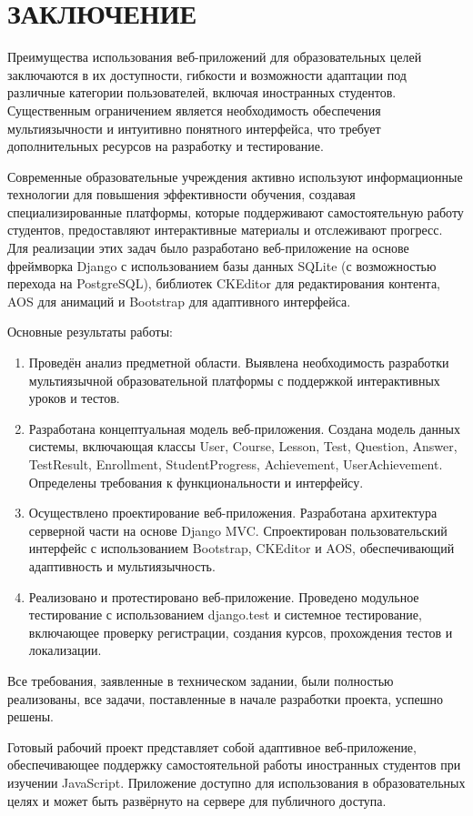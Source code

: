 \section*{ЗАКЛЮЧЕНИЕ}

Преимущества использования веб-приложений для образовательных целей заключаются в их доступности, гибкости и возможности адаптации под различные категории пользователей, включая иностранных студентов. Существенным ограничением является необходимость обеспечения мультиязычности и интуитивно понятного интерфейса, что требует дополнительных ресурсов на разработку и тестирование.

Современные образовательные учреждения активно используют информационные технологии для повышения эффективности обучения, создавая специализированные платформы, которые поддерживают самостоятельную работу студентов, предоставляют интерактивные материалы и отслеживают прогресс. Для реализации этих задач было разработано веб-приложение на основе фреймворка Django с использованием базы данных SQLite (с возможностью перехода на PostgreSQL), библиотек CKEditor для редактирования контента, AOS для анимаций и Bootstrap для адаптивного интерфейса.

Основные результаты работы:

\begin{enumerate}
	\item Проведён анализ предметной области. Выявлена необходимость разработки мультиязычной образовательной платформы с поддержкой интерактивных уроков и тестов.
	\item Разработана концептуальная модель веб-приложения. Создана модель данных системы, включающая классы User, Course, Lesson, Test, Question, Answer, TestResult, Enrollment, StudentProgress, Achievement, UserAchievement. Определены требования к функциональности и интерфейсу.
	\item Осуществлено проектирование веб-приложения. Разработана архитектура серверной части на основе Django MVC. Спроектирован пользовательский интерфейс с использованием Bootstrap, CKEditor и AOS, обеспечивающий адаптивность и мультиязычность.
	\item Реализовано и протестировано веб-приложение. Проведено модульное тестирование с использованием django.test и системное тестирование, включающее проверку регистрации, создания курсов, прохождения тестов и локализации.
\end{enumerate}

Все требования, заявленные в техническом задании, были полностью реализованы, все задачи, поставленные в начале разработки проекта, успешно решены.

Готовый рабочий проект представляет собой адаптивное веб-приложение, обеспечивающее поддержку самостоятельной работы иностранных студентов при изучении JavaScript. Приложение доступно для использования в образовательных целях и может быть развёрнуто на сервере для публичного доступа.